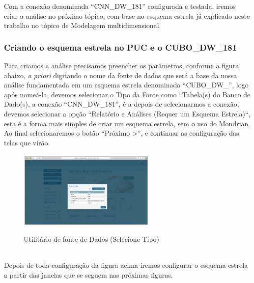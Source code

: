 Com a conex\~{a}o denominada ``CNN\_DW\_181'' configurada e testada, iremos criar a an\'{a}lise 
no pr\'{o}ximo t\'{o}pico, com base no esquema estrela j\'{a} explicado neste trabalho no 
t\'{o}pico de Modelagem multidimensional.

\subsubsection{Criando o esquema estrela no PUC e o CUBO\_DW\_181}

Para criamos a an\'{a}lise precisamos preencher os par\^{a}metros, conforme a figura abaixo, \textit{a priori} digitando 
o nome da fonte de dados que ser\'{a} a base da nossa an\'{a}lise fundamentada em um esquema estrela denominada
``CUBO\_DW_'', logo ap\'{o}s nome\'{a}-la, devemos selecionar o Tipo da Fonte como ``Tabela(s) do Banco de Dado(s), 
a conex\~{a}o ``CNN\_DW\_181'', \'{e} a depois de selecionarmos a conex\~{a}o, devemos selecionar a op\c{c}\~{a}o ``Relat\'{o}rio e An\'{a}lises
(Requer um Esquema Estrela)``, esta \'{e} a forma mais simples de criar um esquema estrela, sem o uso do Mondrian. 
Ao final selecionaremos o bot\~{a}o  ``Pr\'{o}ximo >'', e continuar as configura\c{c}\~{a}o das telas que vir\~{a}o.  

\begin{figure}[H]
	\vspace*{0,2cm}
    \centering
    \caption{Utilit\'{a}rio de fonte de Dados (Selecione Tipo)}
    \includegraphics[width=0.6\textwidth]{./04-figuras/figura-puc-utiliario-fonte-de-dados-selecione-tipo}
    \label{fig:ilustfigpucutiliariofontededadosselecionetipo}
\end{figure}
\vspace*{-0,9cm}
{\raggedright {}} \\

Depois de toda configura\c{c}\~{a}o da figura acima iremos configurar o esquema estrela a partir das janelas que se seguem nas pr\'{o}ximas figuras.

